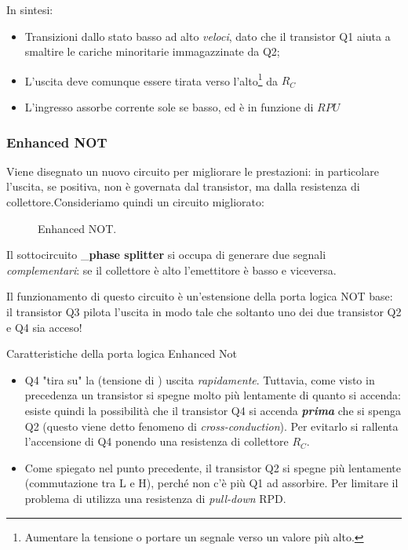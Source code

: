 \documentclass[
]{book}
\begin{document}
\begin{redbox}{In sintesi:}
\begin{itemize}
\item Transizioni dallo stato basso ad alto \emph{veloci}, dato che il transistor Q1 aiuta a smaltire le cariche minoritarie immagazzinate da Q2;
\item L'uscita deve comunque essere tirata verso l'alto\footnote{Aumentare la tensione o portare un segnale verso un valore più alto.} da $R_C$
\item L'ingresso assorbe corrente sole se basso, ed è in funzione di $RPU$
\end{itemize}
\end{redbox}

\subsubsection{Enhanced NOT}\label{enhanced-not}

Viene disegnato un nuovo circuito per migliorare le prestazioni: in
particolare l'uscita, se positiva, non è governata dal transistor, ma
dalla resistenza di collettore.\newline Consideriamo quindi un circuito
migliorato:

\begin{figure}[H]
    \centering
    \resizebox{0.5\textwidth}{!}{}
    \caption{Enhanced NOT.}
\end{figure}

Il sottocircuito \_\textbf{phase splitter} si occupa di generare due
segnali \emph{complementari}: se il collettore è alto l'emettitore è
basso e viceversa.

Il funzionamento di questo circuito è un'estensione della porta logica
NOT base: il transistor Q3 pilota l'uscita in modo tale che soltanto uno
dei due transistor Q2 e Q4 sia acceso!

\begin{bluebox}{Caratteristiche della porta logica Enhanced Not}
\begin{itemize}
\item Q4 "tira su" la (tensione di ) uscita \emph{rapidamente}. Tuttavia, come visto in precedenza un transistor si spegne molto più lentamente di quanto si accenda: esiste quindi la possibilità che il transistor Q4 si accenda \emph{\textbf{prima}} che si spenga Q2 (questo viene detto fenomeno di \emph{cross-conduction}). Per evitarlo si rallenta l'accensione di Q4 ponendo una resistenza di collettore $R_C$.
\item Come spiegato nel punto precedente, il transistor Q2 si spegne più lentamente (commutazione tra L e H), perché non c'è più Q1 ad assorbire. Per limitare il problema di utilizza una resistenza di \emph{pull-down} RPD.
\end{itemize}
\end{bluebox}
\end{document}
